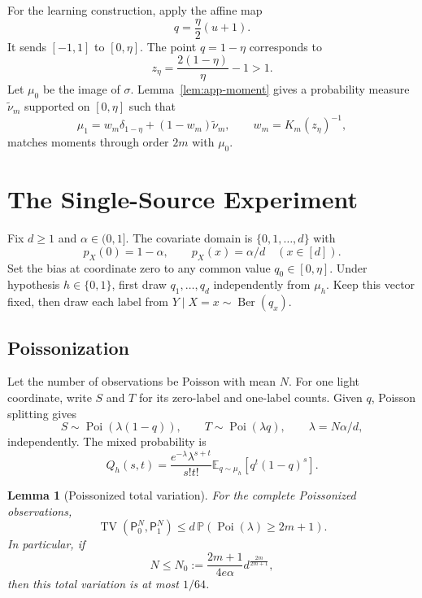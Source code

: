 \documentclass[twoside]{article}
\newtheorem{lemma}[theorem]{Lemma}
\newcommand{\E}{\mathbb E}
\newcommand{\PP}{\mathbb P}
\newcommand{\TV}{\operatorname{TV}}
\newcommand{\Ber}{\operatorname{Ber}}
\newcommand{\Poi}{\operatorname{Poi}}
\newcommand{\1}{\mathbf 1}
\begin{document}
For the learning construction, apply the affine map
\[
 q=\frac{\eta}{2}(u+1).
\]
It sends $[-1,1]$ to $[0,\eta]$. The point $q=1-\eta$ corresponds to
\[
 z_\eta=\frac{2(1-\eta)}{\eta}-1>1.
\]
Let $\mu_0$ be the image of $\sigma$. Lemma~\ref{lem:app-moment} gives a
probability measure $\widetilde\nu_m$ supported on $[0,\eta]$ such that
\begin{equation}
 \mu_1=w_m\delta_{1-\eta}+(1-w_m)\widetilde\nu_m,
 \qquad w_m=K_m(z_\eta)^{-1},
 \label{eq:app-bias-pair}
\end{equation}
matches moments through order $2m$ with $\mu_0$.

\section{The Single-Source Experiment}
\label{app:testing}

Fix $d\ge1$ and $\alpha\in(0,1]$. The covariate domain is
$\{0,1,\ldots,d\}$ with
\[
 p_X(0)=1-\alpha,
 \qquad p_X(x)=\alpha/d\quad(x\in[d]).
\]
Set the bias at coordinate zero to any common value $q_0\in[0,\eta]$.
Under hypothesis $h\in\{0,1\}$, first draw
$q_1,\ldots,q_d$ independently from $\mu_h$. Keep this vector fixed, then
draw each label from $Y\mid X=x\sim\Ber(q_x)$.

\subsection{Poissonization}

Let the number of observations be Poisson with mean $N$. For one light
coordinate, write $S$ and $T$ for its zero-label and one-label counts. Given
$q$, Poisson splitting gives
\[
 S\sim\Poi(\lambda(1-q)),
 \qquad T\sim\Poi(\lambda q),
 \qquad \lambda=N\alpha/d,
\]
independently. The mixed probability is
\begin{equation}
 Q_h(s,t)=\frac{e^{-\lambda}\lambda^{s+t}}{s!t!}
 \E_{q\sim\mu_h}[q^t(1-q)^s].
 \label{eq:app-count-law}
\end{equation}

\begin{lemma}[Poissonized total variation]
\label{lem:app-tv}
For the complete Poissonized observations,
\[
 \TV(\mathsf P_0^N,\mathsf P_1^N)
 \le d\,\PP(\Poi(\lambda)\ge2m+1).
\]
In particular, if
\begin{equation}
 N\le N_0:=\frac{2m+1}{4e\alpha}
 d^{\frac{2m}{2m+1}},
 \label{eq:app-N0}
\end{equation}
then this total variation is at most $1/64$.
\end{lemma}
\end{document}
